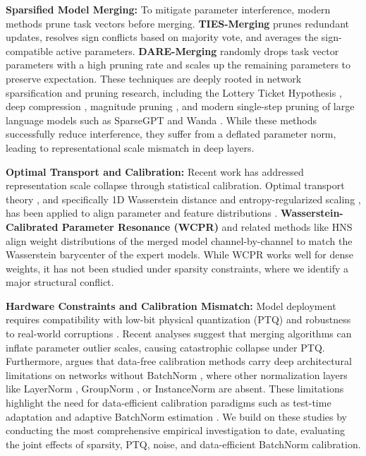 \documentclass{article}
\theoremstyle{plain}
\theoremstyle{definition}
\theoremstyle{remark}
\begin{document}
\textbf{Sparsified Model Merging:} To mitigate parameter interference, modern methods prune task vectors before merging. \textbf{TIES-Merging} \cite{yadav2023ties} prunes redundant updates, resolves sign conflicts based on majority vote, and averages the sign-compatible active parameters. \textbf{DARE-Merging} \cite{yu2023language} randomly drops task vector parameters with a high pruning rate and scales up the remaining parameters to preserve expectation. These techniques are deeply rooted in network sparsification and pruning research, including the Lottery Ticket Hypothesis \cite{frankle2018lottery}, deep compression \cite{han2015deep}, magnitude pruning \cite{han2015learning}, and modern single-step pruning of large language models such as SparseGPT \cite{frantar2023sparsegpt} and Wanda \cite{sun2023simple}. While these methods successfully reduce interference, they suffer from a deflated parameter norm, leading to representational scale mismatch in deep layers.

\textbf{Optimal Transport and Calibration:} Recent work has addressed representation scale collapse through statistical calibration. Optimal transport theory \cite{villani2009optimal}, and specifically 1D Wasserstein distance and entropy-regularized scaling \cite{cuturi2013sinkhorn}, has been applied to align parameter and feature distributions \cite{singh2020model}. \textbf{Wasserstein-Calibrated Parameter Resonance (WCPR)} \cite{submission9} and related methods like HNS \cite{submission5} align weight distributions of the merged model channel-by-channel to match the Wasserstein barycenter of the expert models. While WCPR works well for dense weights, it has not been studied under sparsity constraints, where we identify a major structural conflict.

\textbf{Hardware Constraints and Calibration Mismatch:} Model deployment requires compatibility with low-bit physical quantization (PTQ) \cite{nagel2019data, frantar2022gptq, li2021brecq, yao2022zeroquant, dettmers2022llm, xiao2023smoothquant, lin2023awq, chee2023quip} and robustness to real-world corruptions \cite{hendrycks2019benchmarking}. Recent analyses \cite{submission5, submission10} suggest that merging algorithms can inflate parameter outlier scales, causing catastrophic collapse under PTQ. Furthermore, \citet{submission10} argues that data-free calibration methods carry deep architectural limitations on networks without BatchNorm \cite{ioffe2015batch}, where other normalization layers like LayerNorm \cite{ba2016layer}, GroupNorm \cite{wu2018group}, or InstanceNorm \cite{ulyanov2016instance} are absent. These limitations highlight the need for data-efficient calibration paradigms such as test-time adaptation \cite{wang2020tent} and adaptive BatchNorm estimation \cite{liang2018source, li2016revisiting}. We build on these studies by conducting the most comprehensive empirical investigation to date, evaluating the joint effects of sparsity, PTQ, noise, and data-efficient BatchNorm calibration.
\end{document}
